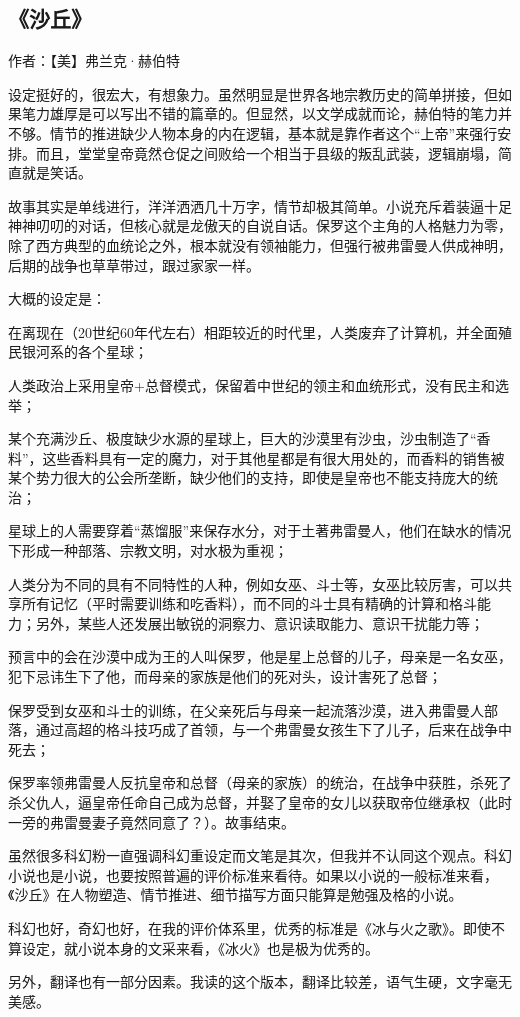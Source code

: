 \subsection{《沙丘》}

作者：【美】弗兰克·赫伯特

设定挺好的，很宏大，有想象力。虽然明显是世界各地宗教历史的简单拼接，但如果笔力雄厚是可以写出不错的篇章的。但显然，以文学成就而论，赫伯特的笔力并不够。情节的推进缺少人物本身的内在逻辑，基本就是靠作者这个“上帝”来强行安排。而且，堂堂皇帝竟然仓促之间败给一个相当于县级的叛乱武装，逻辑崩塌，简直就是笑话。

故事其实是单线进行，洋洋洒洒几十万字，情节却极其简单。小说充斥着装逼十足神神叨叨的对话，但核心就是龙傲天的自说自话。保罗这个主角的人格魅力为零，除了西方典型的血统论之外，根本就没有领袖能力，但强行被弗雷曼人供成神明，后期的战争也草草带过，跟过家家一样。

大概的设定是：
\begin{enumerate*}
    \item 在离现在（20世纪60年代左右）相距较近的时代里，人类废弃了计算机，并全面殖民银河系的各个星球；
    \item 人类政治上采用皇帝+总督模式，保留着中世纪的领主和血统形式，没有民主和选举；
    \item 某个充满沙丘、极度缺少水源的星球上，巨大的沙漠里有沙虫，沙虫制造了“香料”，这些香料具有一定的魔力，对于其他星都是有很大用处的，而香料的销售被某个势力很大的公会所垄断，缺少他们的支持，即使是皇帝也不能支持庞大的统治；
    \item 星球上的人需要穿着“蒸馏服”来保存水分，对于土著弗雷曼人，他们在缺水的情况下形成一种部落、宗教文明，对水极为重视；
    \item 人类分为不同的具有不同特性的人种，例如女巫、斗士等，女巫比较厉害，可以共享所有记忆（平时需要训练和吃香料），而不同的斗士具有精确的计算和格斗能力；另外，某些人还发展出敏锐的洞察力、意识读取能力、意识干扰能力等；
    \item 预言中的会在沙漠中成为王的人叫保罗，他是星上总督的儿子，母亲是一名女巫，犯下忌讳生下了他，而母亲的家族是他们的死对头，设计害死了总督；
    \item 保罗受到女巫和斗士的训练，在父亲死后与母亲一起流落沙漠，进入弗雷曼人部落，通过高超的格斗技巧成了首领，与一个弗雷曼女孩生下了儿子，后来在战争中死去；
    \item 保罗率领弗雷曼人反抗皇帝和总督（母亲的家族）的统治，在战争中获胜，杀死了杀父仇人，逼皇帝任命自己成为总督，并娶了皇帝的女儿以获取帝位继承权（此时一旁的弗雷曼妻子竟然同意了？）。故事结束。
\end{enumerate*}

虽然很多科幻粉一直强调科幻重设定而文笔是其次，但我并不认同这个观点。科幻小说也是小说，也要按照普遍的评价标准来看待。如果以小说的一般标准来看，《沙丘》在人物塑造、情节推进、细节描写方面只能算是勉强及格的小说。

科幻也好，奇幻也好，在我的评价体系里，优秀的标准是《冰与火之歌》。即使不算设定，就小说本身的文采来看，《冰火》也是极为优秀的。

另外，翻译也有一部分因素。我读的这个版本，翻译比较差，语气生硬，文字毫无美感。